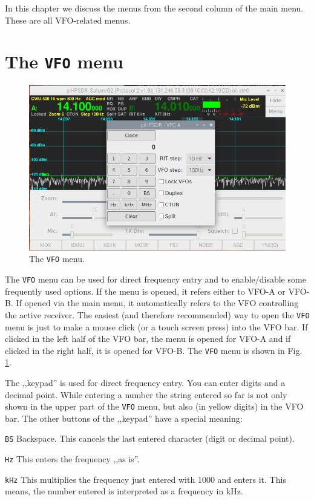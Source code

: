 \documentclass[12pt]{book}
\def\rett#1{\texttt{\color{red}#1}}
\def\bltt#1{\texttt{\color{blue}#1}}
\begin{document}
In this chapter we discuss the menus from the second column
of the main menu. These are all VFO-related menus.


\section{The \texttt{VFO}  menu}
\label{sec:vfomenu}
\begin{figure}[ht]
\includegraphics[width=12cm]{VFOmenu.png}
\caption{The \bltt{VFO} menu.}
\label{fig:VFOmenu}
\end{figure}

The \bltt{VFO} menu can be used for direct frequency entry and to
enable/disable some frequently used options. If the menu is opened,
it refers either to VFO-A or VFO-B. If opened via the main menu,
it automatically refers to the VFO controlling the active receiver.
The easiest (and therefore recommended) way to open the \bltt{VFO}
menu is just to make a mouse click (or a touch screen press) into the
VFO bar. If clicked in the left half of the VFO bar, the menu is opened
for VFO-A and if clicked in the right half, it is opened for VFO-B.
The \bltt{VFO} menu is shown in Fig. \ref{fig:VFOmenu}.


The ,,keypad'' is used for direct frequency entry. You can enter
digits and a decimal point. While entering a number the string
entered so far is not only shown in the upper part of the
\bltt{VFO} menu, but also (in yellow digits) in the VFO bar.
The other buttons of the ,,keypad'' have a special meaning:



\rett{BS} Backspace. This cancels the last entered character
(digit or decimal point).

\rett{Hz} This enters the frequency ,,as is''.

\rett{kHz} This multiplies the frequency just entered with 1000 and
enters it. This means, the number entered is interpreted as a
frequency in kHz.
\end{document}
